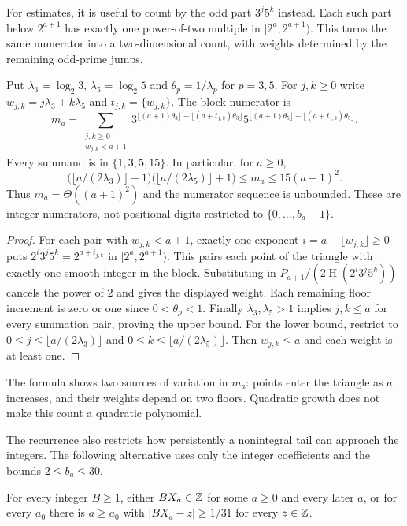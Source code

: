 \documentclass[11pt]{article}
\theoremstyle{remark}
\theoremstyle{plain}
\newcommand{\hgt}{\operatorname{H}}
\begin{document}
For estimates, it is useful to count by the odd part $3^j5^k$ instead.
Each such part below $2^{a+1}$ has exactly one power-of-two multiple in
$[2^a,2^{a+1})$.  This turns the same numerator into a two-dimensional
count, with weights determined by the remaining odd-prime jumps.

\begin{lemma}
\label{long269:res:literal-triangle}
Put $\lambda_3=\log_2 3$, $\lambda_5=\log_2 5$ and
$\theta_p=1/\lambda_p$ for $p=3,5$.
For $j,k\ge0$ write $w_{j,k}=j\lambda_3+k\lambda_5$ and
$t_{j,k}=\{w_{j,k}\}$.  The block numerator is
\[
 m_a=\sum_{\substack{j,k\ge0\\w_{j,k}<a+1}}
 3^{\lfloor(a+1)\theta_3\rfloor-\lfloor(a+t_{j,k})\theta_3\rfloor}
 5^{\lfloor(a+1)\theta_5\rfloor-\lfloor(a+t_{j,k})\theta_5\rfloor}.
\]
Every summand is in $\{1,3,5,15\}$.  In particular, for $a\ge0$,
\[
 \bigl(\lfloor a/(2\lambda_3)\rfloor+1\bigr)
 \bigl(\lfloor a/(2\lambda_5)\rfloor+1\bigr)
 \le m_a\le15(a+1)^2.
\]
Thus $m_a=\Theta((a+1)^2)$ and the numerator sequence is unbounded.
These are integer numerators, not positional digits restricted to
$\{0,\ldots,b_a-1\}$.
\end{lemma}
\begin{proof}
For each pair with $w_{j,k}<a+1$, exactly one exponent
$i=a-\lfloor w_{j,k}\rfloor\ge0$ puts
$2^i3^j5^k=2^{a+t_{j,k}}$ in $[2^a,2^{a+1})$.
This pairs each point of the triangle with exactly one smooth integer
in the block.  Substituting in
$P_{a+1}/(2\hgt(2^i3^j5^k))$ cancels the power of $2$ and gives the displayed
weight.  Each remaining floor increment is zero or one since
$0<\theta_p<1$.  Finally $\lambda_3,\lambda_5>1$ implies
$j,k\le a$ for every summation pair, proving the upper bound.
For the lower bound, restrict to
$0\le j\le\lfloor a/(2\lambda_3)\rfloor$ and
$0\le k\le\lfloor a/(2\lambda_5)\rfloor$.
Then $w_{j,k}\le a$ and each weight is at least one.
\end{proof}
The formula shows two sources of variation in $m_a$: points enter the
triangle as $a$ increases, and their weights depend on two floors.
Quadratic growth does not make this count a quadratic polynomial.

The recurrence also restricts how persistently a nonintegral tail can
approach the integers.  The following alternative uses only the integer
coefficients and the bounds $2\le b_a\le30$.

\begin{proposition}\label{long269:res:actual-dichotomy}
For every integer $B\ge1$, either $BX_a\in\mathbb{Z}$ for some $a\ge0$ and every
later $a$, or for every $a_0$ there is $a\ge a_0$ with
$|BX_a-z|\ge1/31$ for every $z\in\mathbb{Z}$.
\end{proposition}
\end{document}
